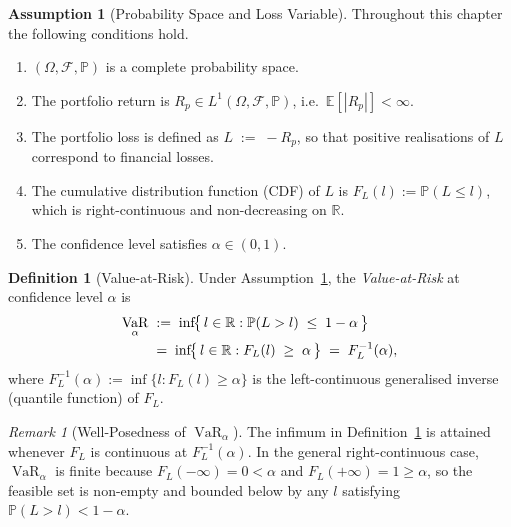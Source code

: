 \documentclass[12pt,openany]{book}
\newcommand{\R}{\mathbb{R}}
\newcommand{\E}{\mathbb{E}}
\numberwithin{equation}{chapter}
\theoremstyle{plain}
\theoremstyle{definition}
\newtheorem{definition}[theorem]{Definition}
\newtheorem{assumption}[theorem]{Assumption}
\theoremstyle{remark}
\newtheorem{remark}[theorem]{Remark}
\numberwithin{equation}{chapter}
\theoremstyle{plain}
\DeclareMathOperator{\VaR}{VaR}
\begin{document}
\begin{assumption}[Probability Space and Loss Variable]
\label{ass:prob-space}
Throughout this chapter the following conditions hold.
\begin{enumerate}
  \item $(\Omega,\mathcal{F},\mathbb{P})$ is a complete probability space.
  \item The portfolio return is $R_p \in L^1(\Omega,\mathcal{F},\mathbb{P})$,
        i.e.\ $\E[|R_p|] < \infty$.
  \item The portfolio loss is defined as $L \;:=\; -R_p$, so that
        positive realisations of $L$ correspond to financial losses.
  \item The cumulative distribution function (CDF) of $L$ is
        $F_L(l) := \mathbb{P}(L \leq l)$, which is right-continuous
        and non-decreasing on $\R$.
  \item The confidence level satisfies $\alpha \in (0,1)$.
\end{enumerate}
\end{assumption}

\begin{definition}[Value-at-Risk]
\label{def:var}
Under Assumption~\ref{ass:prob-space}, the \emph{Value-at-Risk} at
confidence level $\alpha$ is
\begin{align}
  \VaR_\alpha
    &\;:=\; \inf\!\bigl\{\,l \in \R : \mathbb{P}(L > l)
            \;\leq\; 1 - \alpha\,\bigr\} \label{eq:var} \\
    &\;=\;  \inf\!\bigl\{\,l \in \R : F_L(l) \;\geq\; \alpha\,\bigr\}
            \;=\; F_L^{-1}(\alpha), \notag
\end{align}
where $F_L^{-1}(\alpha) := \inf\{l : F_L(l) \geq \alpha\}$ is the
left-continuous generalised inverse (quantile function) of $F_L$.
\end{definition}

\begin{remark}[Well-Posedness of $\VaR_\alpha$]
\label{rem:var-wellposed}
The infimum in Definition~\ref{def:var} is attained whenever $F_L$ is
continuous at $F_L^{-1}(\alpha)$.  In the general right-continuous
case, $\VaR_\alpha$ is finite because $F_L(-\infty)=0 < \alpha$ and
$F_L(+\infty)=1 \geq \alpha$, so the feasible set is non-empty and
bounded below by any $l$ satisfying $\mathbb{P}(L > l) < 1 - \alpha$.
\end{remark}
\end{document}
